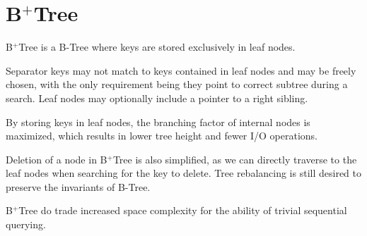\section{B$^+$Tree}

\begin{definition}
  B$^+$Tree is a B-Tree where keys are stored exclusively in leaf nodes.
\end{definition}

Separator keys may not match to keys contained in leaf nodes and may be freely chosen, with the only requirement being they point to correct subtree during a search. Leaf nodes may optionally include a pointer to a right sibling.



By storing keys in leaf nodes, the branching factor of internal nodes is maximized, which results in lower tree height and fewer I/O operations.

Deletion of a node in B$^+$Tree is also simplified, as we can directly traverse to the leaf nodes when searching for the key to delete. Tree rebalancing is still desired to preserve the invariants of B-Tree.

B$^+$Tree do trade increased space complexity for the ability of trivial sequential querying.